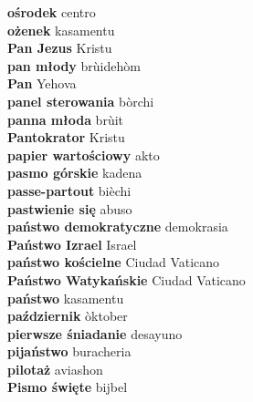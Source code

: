 \textbf{ ośrodek  } centro \\
\textbf{ ożenek  } kasamentu \\
\textbf{ Pan Jezus  } Kristu \\
\textbf{ pan młody  } brùidehòm \\
\textbf{ Pan  } Yehova \\
\textbf{ panel sterowania  } bòrchi \\
\textbf{ panna młoda  } brùit \\
\textbf{ Pantokrator  } Kristu \\
\textbf{ papier wartościowy  } akto \\
\textbf{ pasmo górskie  } kadena \\
\textbf{ passe-partout  } bièchi \\
\textbf{ pastwienie się  } abuso \\
\textbf{ państwo demokratyczne  } demokrasia \\
\textbf{ Państwo Izrael  } Israel \\
\textbf{ państwo kościelne  } Ciudad Vaticano \\
\textbf{ Państwo Watykańskie  } Ciudad Vaticano \\
\textbf{ państwo  } kasamentu \\
\textbf{ październik  } òktober \\
\textbf{ pierwsze śniadanie  } desayuno \\
\textbf{ pijaństwo  } buracheria \\
\textbf{ pilotaż  } aviashon \\
\textbf{ Pismo święte  } bijbel \\
